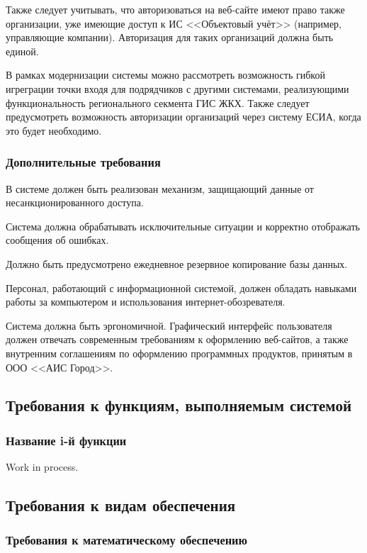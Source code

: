 Также следует учитывать, что авторизоваться на веб-сайте имеют право также организации, уже имеющие доступ к ИС <<Объектовый учёт>> (например, управляющие компании).
Авторизация для таких организаций должна быть единой.

В рамках модернизации системы можно рассмотреть возможность гибкой игреграции точки входя для подрядчиков с другими системами, реализующими функциональность регионального секмента ГИС ЖКХ.
Также следует предусмотреть возможность авторизации организаций через систему ЕСИА, когда это будет необходимо.

\subsubsection{Дополнительные требования}

В системе должен быть реализован механизм, защищающий данные от несанкционированного доступа.

Система должна обрабатывать исключительные ситуации и корректно отображать сообщения об ошибках.

Должно быть предусмотрено ежедневное резервное копирование базы данных.

Персонал, работающий с информационной системой, должен обладать навыками работы за компьютером и использования интернет-обозревателя.

Система должна быть эргономичной.
Графический интерфейс пользователя должен отвечать современным требованиям к оформлению веб-сайтов, а также внутренним соглашениям по оформлению программных продуктов, принятым в ООО <<АИС Город>>.

\subsection{Требования к функциям, выполняемым системой}

\subsubsection{Название i-й функции}

Work in process.

\subsection{Требования к видам обеспечения}

\subsubsection{Требования к математическому обеспечению}

